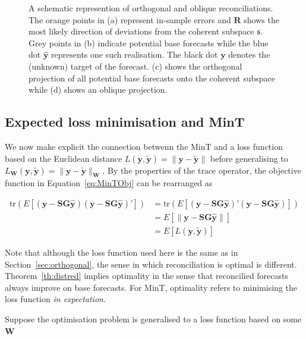 \documentclass[12pt]{article}
\theoremstyle{definition}
\begin{document}
\begin{figure}[!p]
\begin{subfigure}[!h]{0.415\textwidth}
      \caption{}
  \end{subfigure}
  \caption{A schematic represention of orthogonal and oblique reconciliations. The orange points in (a) represent in-sample errors and $\bm{R}$ shows the most likely direction of deviations from the coherent subspace $\mathfrak{s}$. Grey points in (b) indicate potential base forecasts while the blue dot ${\hat{\bm y}}$ represents one such realisation. The black dot ${\bm y}$ denotes the (unknown) target of the forecast. (c) shows the orthogonal projection of all potential base forecasts onto the coherent subspace while (d) shows an oblique projection.}\label{fig:OthogonalVSOblique_projection}
\end{figure}

{\color{blue}

\subsection{Expected loss minimisation and MinT}

We now make explicit the connection betwenn the MinT and a loss function based on the Euclidean distance $L(\bm{y},\tilde{\bm{y}})=\|\bm{y}-\tilde{\bm{y}}\|$ before generalising to $L_{\bm W}(\bm{y},\tilde{\bm{y}})=\|\bm{y}-\tilde{\bm{y}}\|_{\bm W}$.  By the properties of the trace operator, the objective function in Equation~\ref{eq:MinTObj} can be rearranged as

\begin{align*}
\label{eq:MinTObj}
\textrm{tr}(E\left[(\bm{y}-{\bm S}{\bm G}\hat{\bm{y}})(\bm{y}-{\bm S}{\bm G}\hat{\bm{y}})'\right])&=\textrm{tr}(E\left[(\bm{y}-{\bm S}{\bm G}\hat{\bm{y}})'(\bm{y}-{\bm S}{\bm G}\hat{\bm{y}})\right])\\
&=E\left[\|\bm{y}-{\bm S}{\bm G}\hat{\bm{y}}\|\right]\\
&=E\left[L(\bm{y},\tilde{\bm{y}})\right]
\end{align*}

Note that although the loss function used here is the same as in Section~\ref{sec:orthogonal}, the sense in which reconciliation is optimal is different.  Theorem~\ref{th:distred} implies optimality in the sense that reconcilied forecasts always improve on base forecasts.  For MinT, optimality refers to minimising the loss function \textit{in expectation}.

Suppose the optimisation problem is generalised to a loss function based on some ${\bm W}$

}
\end{document}
